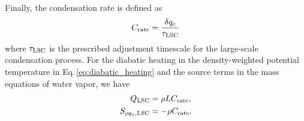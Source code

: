 Finally, the condensation rate is defined as
\begin{align*}
  C_{\rm rate} = \dfrac{\delta q_c}{\tau_{\rm LSC}}
\end{align*}
where $\tau_{\rm LSC}$ is the prescribed adjustment timescale for the large-scale condensation process.
For the diabatic heating in the density-weighted potential temperature in Eq.\,\eqref{eq:diabatic_heating} 
and the source terms in the mass equations of water vapor, 
we have
\begin{align}
  Q_{\rm LSC} &= \rho L C_{\rm rate}, \\
  S_{\rho q_v,{\rm LSC}} &= - \rho C_{\rm rate}.
\end{align}


